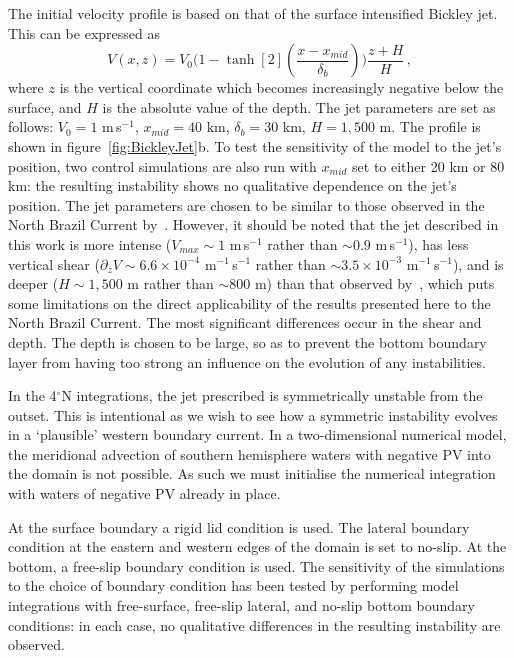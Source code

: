 The initial velocity profile is based on that of the surface intensified Bickley jet. This can be expressed as
\begin{equation}
    V(x, z) = V_0 \Bigg( 1 - \tanh[2](\frac{x - x_{mid}}{\delta_b})\Bigg) \frac{z + H}{H} \, ,
\end{equation}
where $z$ is the vertical coordinate which becomes increasingly negative below the surface, and $H$ is the absolute value of the depth. The jet parameters are set as follows: $V_0 = 1$ m\,s$^{-1}$, $x_{mid} = 40$ km, $\delta_b = 30$ km, $H = 1,500$ m. The profile is shown in figure~\ref{fig:BickleyJet}b. To test the sensitivity of the model to the jet's position, two control simulations are also run with $x_{mid}$ set to either 20 km or 80 km: the resulting instability shows no qualitative dependence on the jet's position. The jet parameters are chosen to be similar to those observed in the North Brazil Current by~\citet{Johns1998}. However, it should be noted that the jet described in this work is more intense ($V_{max} \sim 1$ m\,s$^{-1}$ rather than $\sim 0.9$ m\,s$^{-1}$), has less vertical shear ($\partial_z V \sim 6.6\times 10^{-4}$ m$^{-1}$\,s$^{-1}$ rather than $\sim 3.5 \times 10^{-3}$ m$^{-1}$\,s$^{-1}$), and is deeper ($H\sim 1,500$ m rather than $\sim 800$ m) than that observed by~\citet{Johns1998}, which puts some limitations on the direct applicability of the results presented here to the North Brazil Current. The most significant differences occur in the shear and depth. The depth is chosen to be large, so as to prevent the bottom boundary layer from having too strong an influence on the evolution of any instabilities.

In the 4$^\circ$N integrations, the jet prescribed is symmetrically unstable from the outset. This is intentional as we wish to see how a symmetric instability evolves in a `plausible' western boundary current. In a two-dimensional numerical model, the meridional advection of southern hemisphere waters with negative PV into the domain is not possible. As such we must initialise the numerical integration with waters of negative PV already in place.

At the surface boundary a rigid lid condition is used. The lateral boundary condition at the eastern and western edges of the domain is set to no-slip. At the bottom, a free-slip boundary condition is used. The sensitivity of the simulations to the choice of boundary condition has been tested by performing model integrations with free-surface, free-slip lateral, and no-slip bottom boundary conditions: in each case, no qualitative differences in the resulting instability are observed.

